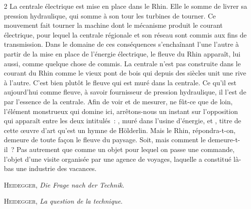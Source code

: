 \documentclass[a4paper,14pt,landscape]{extarticle}
\newcommand\chunks[2]{%
\begin{leftcolumn*}\begin{otherlanguage}{german}%
{#1}%
\end{otherlanguage}\end{leftcolumn*}%
\begin{rightcolumn}\begin{otherlanguage}{french}%
{#2}%
\end{otherlanguage}\end{rightcolumn}%
}
\begin{document}
\begin{paracol}{2}
         {La centrale électrique est mise en place dans le Rhin. Elle le somme de livrer sa pression hydraulique, qui somme à son tour les turbines de tourner. Ce mouvement fait tourner la machine dont le mécanisme produit le courant électrique, pour lequel la centrale régionale et son réseau sont commis aux fins de transmission. Dans le domaine de ces conséquences s’enchaînant l’une l’autre à partir de la mise en place de l’énergie électrique, le fleuve du Rhin apparaît, lui aussi, comme quelque chose de commis. La centrale n’est pas construite dans le courant du Rhin comme le vieux pont de bois qui depuis des siècles unit une rive à l’autre. C’est bien plutôt le fleuve qui est muré dans la centrale. Ce qu’il est aujourd’hui comme fleuve, à savoir fournisseur de pression hydraulique, il l’est de par l’essence de la centrale. Afin de voir et de mesurer, ne fût-ce que de loin, l’élément monstrueux qui domine ici, arrêtons-nous un instant sur l’opposition qui apparaît entre les deux intitulés : , muré dans l’usine d’énergie, et , titre de cette œuvre d’art qu’est un hymne de Hölderlin. Mais le Rhin, répondra-t-on, demeure de toute façon le fleuve du paysage. Soit, mais comment le demeure-t-il ? Pas autrement que comme un objet pour lequel on passe une commande, l’objet d’une visite organisée par une agence de voyages, laquelle a constitué là-bas une industrie des vacances.}

  \chunks{\begin{flushright}
          \large\textsc{Heidegger}, \textit{Die Frage nach der Technik}.
          \end{flushright}}
         {\begin{flushright}
          \large\textsc{Heidegger}, \textit{La question de la technique}.
          \end{flushright}}

\end{paracol}
\end{document}
